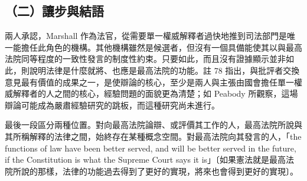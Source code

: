 \subsection{（二）讓步與結語}

兩人承認，Marshall 作為法官，從需要單一權威解釋者過快地推到司法部門是唯一能擔任此角色的機構。其他機構雖然是候選者，但沒有一個具備能使其以與最高法院同等程度的一致性發言的制度性約束。只要如此，而且沒有證據顯示並非如此，則說明法律是什麼就將、也應是最高法院的功能。註 78 指出，與批評者交換意見最有價值的成果之一，是使辯論的核心，至少是兩人與主張由國會擔任單一權威解釋者的人之間的核心，經驗問題的面貌更為清楚；如 Peabody 所觀察，這場辯論可能成為嚴肅經驗研究的跳板，而這種研究尚未進行。

最後一段區分兩種位置。對向最高法院論辯、或評價其工作的人，最高法院所說與其所稱解釋的法律之間，始終存在某種概念空間。對最高法院向其發言的人，「the functions of law have been better served, and will be better served in the future, if the Constitution is what the Supreme Court says it is」〔如果憲法就是最高法院所說的那樣，法律的功能過去得到了更好的實現，將來也會得到更好的實現〕。
